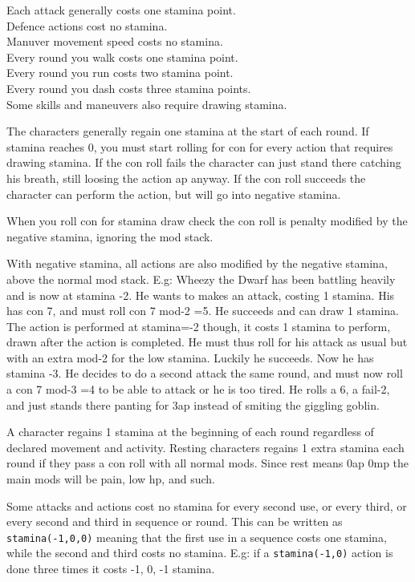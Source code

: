 Each attack generally costs one stamina point. \\
Defence actions cost no stamina.\\ 
Manuver movement speed costs no stamina.\\ 
Every round you walk costs one stamina point. \\
Every round you run costs two stamina point. \\
Every round you dash costs three stamina points. \\
Some skills and maneuvers also require drawing stamina.

The characters generally regain one stamina at the start of each round. If stamina reaches 0, you must start rolling for con for every action that requires drawing stamina. If the con roll fails the character can just stand there catching his breath, still loosing the action ap anyway. If the con roll succeeds the character can perform the action, but will go into negative stamina.

When you roll con for stamina draw check the con roll is penalty modified by the negative stamina, ignoring the mod stack.

With negative stamina, all actions are also modified by the negative stamina, above the normal mod stack.
E.g: Wheezy the Dwarf has been battling heavily and is now at stamina -2. He wants to makes an attack, costing 1 stamina. His has con 7, and must roll con 7 mod-2 =5. He succeeds and can draw 1 stamina. The action is performed at stamina=-2 though, it costs 1 stamina to perform, drawn after the action is completed. He must thus roll for his attack as usual but with an extra mod-2 for the low stamina. Luckily he succeeds. Now he has stamina -3. He decides to do a second attack the same round, and must now roll a con 7 mod-3 =4 to be able to attack or he is too tired. He rolls a 6, a fail-2, and just stands there panting for 3ap instead of smiting the giggling goblin.

A character regains 1 stamina at the beginning of each round regardless of declared movement and activity. Resting characters regains 1 extra stamina each round if they pass a con roll with all normal mods. Since rest means 0ap 0mp the main mods will be pain, low hp, and such. 

Some attacks and actions cost no stamina for every second use, or every third, or every second and third in sequence or round. This can be written as \verb|stamina(-1,0,0)| meaning that the first use in a sequence costs one stamina, while the second and third costs no stamina. E.g: if a \verb|stamina(-1,0)| action is done three times it costs -1, 0, -1 stamina.

